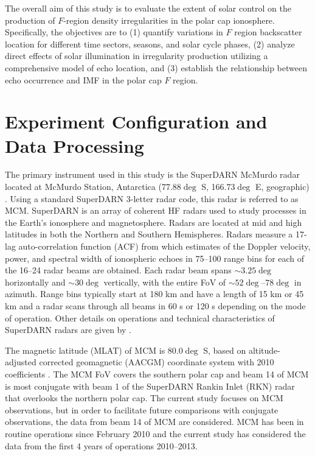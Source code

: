 The overall aim of this study is to evaluate the extent of solar control on the production of \(F\)-region density irregularities in the polar cap ionosphere. Specifically, the objectives are to (1) quantify variations in \(F\) region backscatter location for different time sectors, seasons, and solar cycle phases, (2) analyze direct effects of solar illumination in irregularity production utilizing a comprehensive model of echo location, and (3)  establish the relationship between echo occurrence and IMF in the polar cap \(F\) region.


\section{Experiment Configuration and Data Processing}
\label{Sec:Exp}

The primary instrument used in this study is the SuperDARN McMurdo radar located at McMurdo Station, Antarctica (77.88\(\deg\) S, 166.73\(\deg\) E, geographic) \citep{Bristow2011}. Using a standard SuperDARN 3-letter radar code, this radar is referred to as MCM. SuperDARN is an array of coherent HF radars used to study processes in the Earth's ionosphere and magnetosphere. Radars are located at mid and high latitudes in both the Northern and Southern Hemispheres. Radars measure a 17-lag auto-correlation function (ACF) from which estimates of the Doppler velocity, power, and spectral width of ionospheric echoes in 75--100 range bins for each of the 16--24 radar beams are obtained. Each radar beam spans \(\sim3.25\deg\) horizontally and \(\sim30\deg\) vertically, with the entire FoV of \(\sim52\deg\)--\(78\deg\) in azimuth. Range bins typically start at 180 km and have a length of 15 km or 45 km and a radar scans through all beams in 60 s or 120 s depending on the mode of operation. Other details on operations and technical characteristics of SuperDARN radars are given by \citet{Chisham2007}.

The magnetic latitude (MLAT) of MCM is 80.0\(\deg\) S, based on altitude-adjusted corrected geomagnetic (AACGM) coordinate system with 2010 coefficients \citep[see recent paper by][]{Shepherd2014}. The MCM FoV covers the southern polar cap and beam 14 of MCM is most conjugate with beam 1 of the SuperDARN Rankin Inlet (RKN) radar that overlooks the northern polar cap. The current study focuses on MCM observations, but in order to facilitate future comparisons with conjugate observations, the data from beam 14 of MCM are considered. MCM has been in routine operations since February 2010 and the current study has considered the data from the first 4 years of operations 2010--2013.

